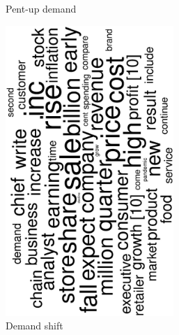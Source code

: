 \begin{figure}
\begin{subfigure}{0.32\textwidth}
		\caption{Pent-up demand}
	\end{subfigure}
	\begin{subfigure}{0.32\textwidth}
		\includegraphics[width=0.7\textwidth,angle=270]{figures/wordcloud9.eps}
		\caption{Demand shift}
	\end{subfigure}
	\begin{subfigure}{0.32\textwidth}

\end{subfigure}
\end{figure}
